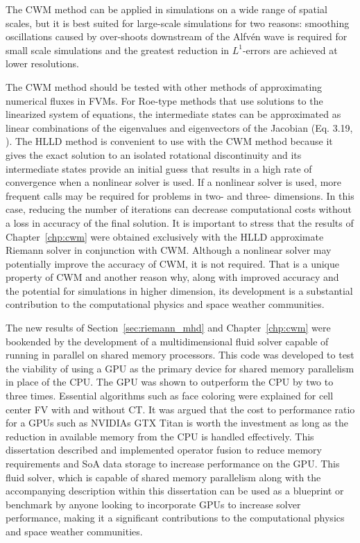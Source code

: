 The CWM method can be applied in simulations on a wide range of spatial scales, but it is best suited for large-scale simulations for two reasons: smoothing oscillations caused by over-shoots downstream of the Alfv{\'e}n wave is required for small scale simulations and the greatest reduction in $L^1$-errors are achieved at lower resolutions.    
  
The CWM method should be tested with other methods of approximating numerical fluxes in FVMs.  For Roe-type methods that use solutions to the linearized system of equations, the intermediate states can be approximated as linear combinations of the eigenvalues and eigenvectors of the Jacobian (Eq. 3.19, \citep{Ryu:1995a}).  The HLLD method is convenient to use with the CWM method because it gives the exact solution to an isolated rotational discontinuity \citep{Miyoshi:2005} and its intermediate states provide an initial guess that results in a high rate of convergence when a nonlinear solver is used.  If a nonlinear solver is used, more frequent calls may be required for problems in two- and three- dimensions.  In this case, reducing the number of iterations can decrease computational costs without a loss in accuracy of the final solution.  It is important to stress that the results of Chapter~\ref{chp:cwm} were obtained exclusively with the HLLD approximate Riemann solver in conjunction with CWM.  Although a nonlinear solver may potentially improve the accuracy of CWM, it is not required.  That is a unique property of CWM and another reason why, along with improved accuracy and the potential for simulations in higher dimension, its development is a substantial contribution to the computational physics and space weather communities.
 
The new results of Section~\ref{sec:riemann_mhd} and Chapter~\ref{chp:cwm} were bookended by the development of a multidimensional fluid solver capable of running in parallel on shared memory processors.  This code was developed to test the viability of using a GPU as the primary device for shared memory parallelism in place of the CPU.  The GPU was shown to outperform the CPU by two to three times.  Essential algorithms such as face coloring were explained for cell center FV with and without CT.  It was argued that the cost to performance ratio for a GPUs such as NVIDIAs GTX Titan is worth the investment as long as the reduction in available memory from the CPU is handled effectively.  This dissertation described and implemented operator fusion to reduce memory requirements and SoA data storage to increase performance on the GPU.  This fluid solver, which is capable of shared memory parallelism along with the accompanying description within this dissertation can be used as a blueprint or benchmark by anyone looking to incorporate GPUs to increase solver performance, making it a significant contributions to the computational physics and space weather communities. 

